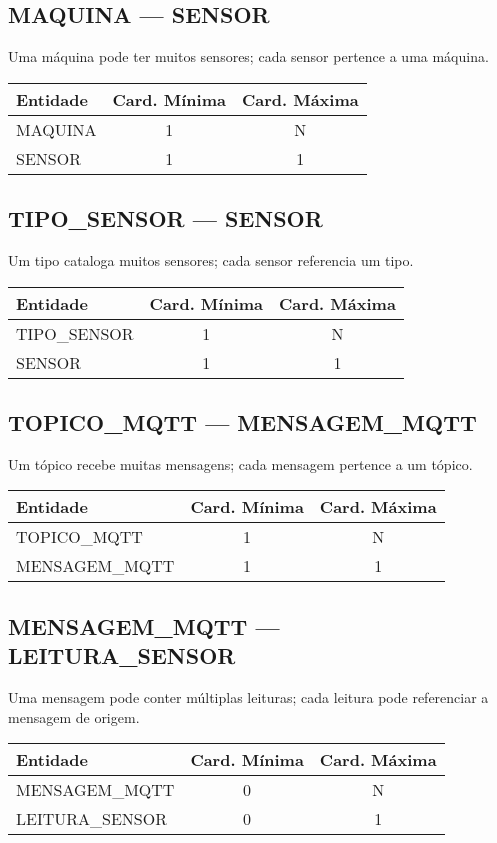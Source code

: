 \documentclass[10pt,a4paper]{article}
\begin{document}
\subsection*{MAQUINA — SENSOR}
Uma máquina pode ter muitos sensores; cada sensor pertence a uma máquina.
\begin{center}
\begin{tabular}{|l|c|c|}
\hline
\rowcolor{vermelhoheader}\color{white}\textbf{Entidade} & \textbf{Card. Mínima} & \textbf{Card. Máxima} \\
\hline
MAQUINA & 1 & N \\
SENSOR & 1 & 1 \\
\hline
\end{tabular}
\end{center}
\hfill
\subsection*{TIPO\_SENSOR — SENSOR}
Um tipo cataloga muitos sensores; cada sensor referencia um tipo.
\begin{center}
\begin{tabular}{|l|c|c|}
\hline
\rowcolor{vermelhoheader}\color{white}\textbf{Entidade} & \textbf{Card. Mínima} & \textbf{Card. Máxima} \\
\hline
TIPO\_SENSOR & 1 & N \\
SENSOR & 1 & 1 \\
\hline
\end{tabular}
\end{center}
\vspace{0.5cm}

\subsection*{TOPICO\_MQTT — MENSAGEM\_MQTT}
Um tópico recebe muitas mensagens; cada mensagem pertence a um tópico.
\begin{center}
\begin{tabular}{|l|c|c|}
\hline
\rowcolor{vermelhoheader}\color{white}\textbf{Entidade} & \textbf{Card. Mínima} & \textbf{Card. Máxima} \\
\hline
TOPICO\_MQTT & 1 & N \\
MENSAGEM\_MQTT & 1 & 1 \\
\hline
\end{tabular}
\end{center}
\hfill
\subsection*{MENSAGEM\_MQTT — LEITURA\_SENSOR}
Uma mensagem pode conter múltiplas leituras; cada leitura pode referenciar a mensagem de origem.
\begin{center}
\begin{tabular}{|l|c|c|}
\hline
\rowcolor{vermelhoheader}\color{white}\textbf{Entidade} & \textbf{Card. Mínima} & \textbf{Card. Máxima} \\
\hline
MENSAGEM\_MQTT & 0 & N \\
LEITURA\_SENSOR & 0 & 1 \\
\hline
\end{tabular}
\end{center}
\vspace{0.5cm}
\end{document}
